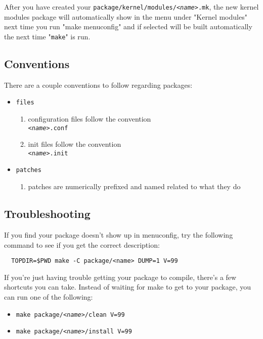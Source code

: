 After you have created your \texttt{package/kernel/modules/\textit{<name>}.mk}, the new kernel modules package
will automatically show in the menu under "Kernel modules" next time you run "make menuconfig" and if selected
will be built automatically the next time "\texttt{make}" is run.

\subsection{Conventions}

There are a couple conventions to follow regarding packages:

\begin{itemize}
    \item \texttt{files}
    \begin{enumerate}
        \item configuration files follow the convention \\
        \texttt{\textit{<name>}.conf}
        \item init files follow the convention \\
        \texttt{\textit{<name>}.init}
    \end{enumerate}
    \item \texttt{patches}
    \begin{enumerate}
        \item patches are numerically prefixed and named related to what they do
    \end{enumerate}
\end{itemize}

\subsection{Troubleshooting}

If you find your package doesn't show up in menuconfig, try the following command to
see if you get the correct description:

\begin{Verbatim}
  TOPDIR=$PWD make -C package/<name> DUMP=1 V=99
\end{Verbatim}

If you're just having trouble getting your package to compile, there's a few
shortcuts you can take. Instead of waiting for make to get to your package, you can
run one of the following:

\begin{itemize}
    \item \texttt{make package/\textit{<name>}/clean V=99}
    \item \texttt{make package/\textit{<name>}/install V=99}
\end{itemize}

